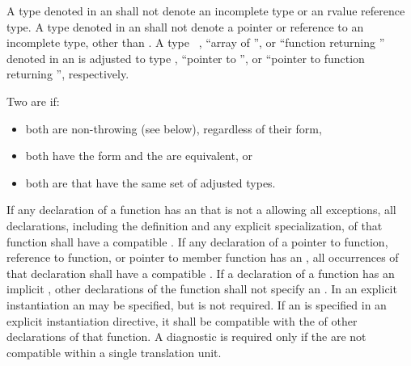 \exitexample

%
A type denoted in an
shall not denote an incomplete type or an rvalue reference type.
A type denoted in an
shall not denote a pointer or reference to an incomplete type, other than
 .
A type \cv\ , ``array of '', or ``function returning ''
denoted in an  is adjusted to type ,
``pointer to '', or ``pointer to function returning '', respectively.

\pnum
{}%
Two  are
 if:

\begin{itemize}
\item both are non-throwing (see below), regardless of their form,

\item both have the form \tcode{)}
and the  are equivalent, or

\item both are  that have the same
set of adjusted types.
\end{itemize}

\pnum
If any declaration of a function has an
that is not a  allowing all exceptions,
all declarations, including the definition and any explicit specialization,
of that function shall have a compatible
.
If any declaration of a pointer to function, reference to function,
or pointer to member function has an
,
all occurrences of that declaration shall have a compatible
.
If a declaration of a function has an implicit
,
other declarations of the function shall not specify an
.
In an explicit instantiation an
may be specified, but is not required.
If an
is specified in an explicit instantiation directive, it shall
be compatible with the  of
other declarations of that function.
A diagnostic is required only if the
 are not compatible
within a single translation unit.


